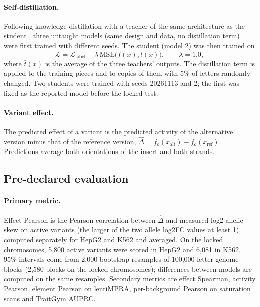 \documentclass[11pt]{article}
\begin{document}
\paragraph{Self-distillation.} Following knowledge distillation \cite{hinton2015distilling} with a teacher of the same architecture as the student \cite{furlanello2018born}, three untaught models (same design and data, no distillation term) were first trained with different seeds. The student (model 2) was then trained on
\begin{equation}
\mathcal{L} = \mathcal{L}_{\text{label}} + \lambda\,\mathrm{MSE}\bigl(f(x), \bar{t}(x)\bigr), \qquad \lambda = 1.0,
\label{eq:distill}
\end{equation}
where $\bar{t}(x)$ is the average of the three teachers' outputs. The distillation term is applied to the training pieces and to copies of them with 5\% of letters randomly changed. Two students were trained with seeds 20261113 and 2; the first was fixed as the reported model before the locked test.

\paragraph{Variant effect.} The predicted effect of a variant is the predicted activity of the alternative version minus that of the reference version, $\hat{\Delta} = f_o(x_{\text{alt}}) - f_o(x_{\text{ref}})$. Predictions average both orientations of the insert and both strands.

\subsection{Pre-declared evaluation}
\label{sec:eval}

\paragraph{Primary metric.} Effect Pearson is the Pearson correlation between $\hat{\Delta}$ and measured log2 allelic skew on active variants (the larger of the two allele log2FC values at least 1), computed separately for HepG2 and K562 and averaged. On the locked chromosomes, 5,800 active variants were scored in HepG2 and 6,081 in K562. 95\% intervals come from 2,000 bootstrap resamples of 100,000-letter genome blocks \cite{kunsch1989jackknife} (2,580 blocks on the locked chromosomes); differences between models are computed on the same resamples. Secondary metrics are effect Spearman, activity Pearson, element Pearson on lentiMPRA, per-background Pearson on saturation scans and TraitGym AUPRC.
\end{document}
